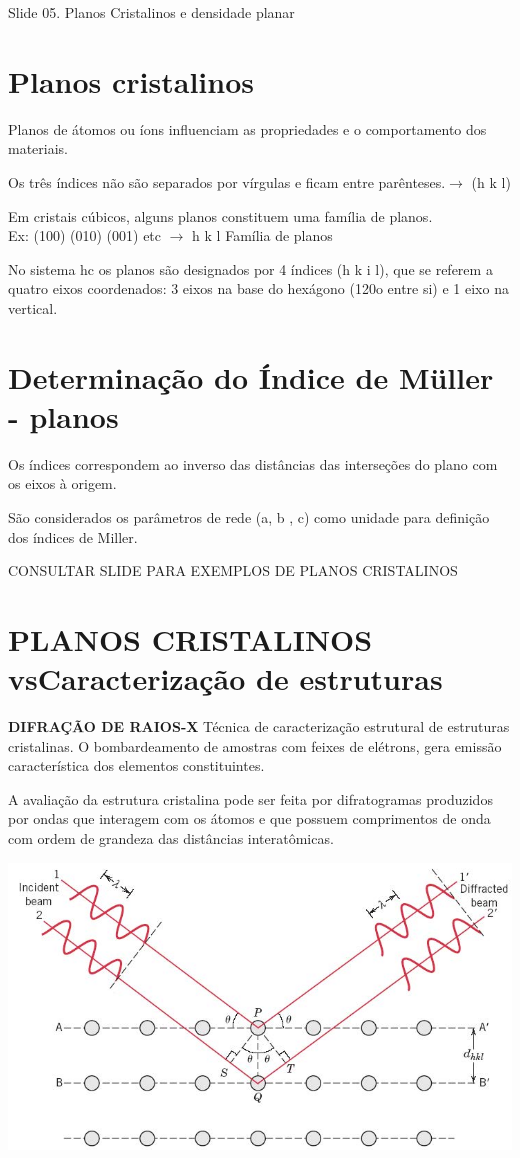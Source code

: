 

{\large Slide 05. Planos Cristalinos e densidade planar}

\section{Planos cristalinos}
\noindent

Planos de átomos ou íons influenciam as propriedades e o comportamento dos materiais.

Os três índices não são separados por vírgulas e ficam entre parênteses.$\rightarrow$ (h k l)

Em cristais cúbicos, alguns planos constituem uma família de planos. \\ Ex: (100) (010) (001) etc $\rightarrow$ { h k l } Família de planos

No sistema hc os planos são designados por 4 índices (h k i l), que se referem a quatro eixos coordenados: 3 eixos na base do hexágono (120o entre si) e 1 eixo na vertical.


\section{Determinação do Índice de Müller - planos}


Os índices correspondem ao inverso das distâncias das interseções do plano com os eixos à origem.

São considerados os parâmetros de rede (a, b , c) como unidade para definição dos índices de Miller.

{\large CONSULTAR SLIDE PARA EXEMPLOS DE PLANOS CRISTALINOS}


\section{PLANOS CRISTALINOS vsCaracterização de estruturas}


\textbf{DIFRAÇÃO DE RAIOS-X} Técnica de caracterização estrutural de estruturas cristalinas. O bombardeamento de amostras com feixes de elétrons, gera emissão característica dos elementos constituintes.

A avaliação da estrutura cristalina pode ser feita por difratogramas produzidos por ondas que interagem com os átomos e que possuem comprimentos de onda com ordem de grandeza das distâncias interatômicas.

\includegraphics[scale=0.4,trim={0 0 0 0}]{figures/difracao}

